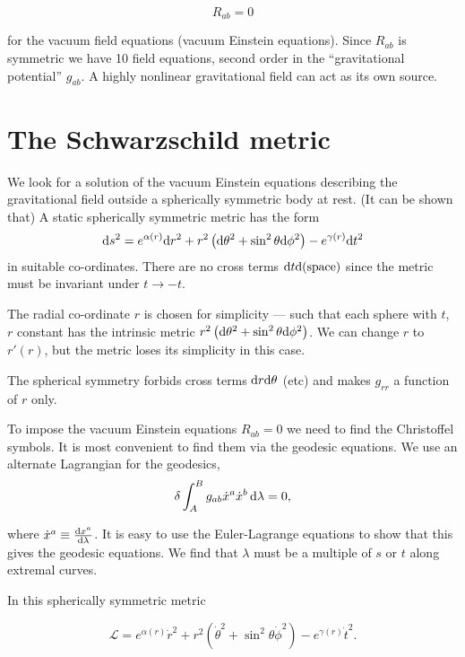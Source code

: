 \documentclass{notes}
\newcommand{\cL}{\mathcal{L}}
\begin{document}
\begin{equation}\label{eq:einstein}
R_{a b} = 0
\end{equation}

for the vacuum field equations (vacuum Einstein equations).  Since
$R_{a b}$ is symmetric we have 10 field equations, second order
in the ``gravitational potential'' $g_{a b}$.  A highly nonlinear
gravitational field can act as its own source.

\section{The Schwarzschild metric}

We look for a solution of the vacuum Einstein equations describing the
gravitational field outside a spherically symmetric body at rest.
(It can be shown that) A static spherically symmetric metric has the
form
\[
\mathrm{d} s^2 = e^{\alpha(r)} \mathrm{d} r^2 + r^2 \left( \mathrm{d} \theta^2
+ \sin^2 \theta \mathrm{d} \phi^2 \right) - e^{\gamma(r)}\mathrm{d} t^2
\]
in suitable co-ordinates.  There are no cross terms $\mathrm{d} t \mathrm{d} (
\text{space})$ since the metric must be invariant under $t \to -t$.

The radial co-ordinate $r$ is chosen for simplicity --- such that each
sphere with $t$, $r$ constant has the intrinsic metric
$r^2 \left( \mathrm{d} \theta^2 + \sin^2 \theta \mathrm{d} \phi^2 \right)$.  We
can change $r$ to $r'(r)$, but the metric loses its simplicity in this
case.

The spherical symmetry forbids cross terms $\mathrm{d} r \mathrm{d} \theta$ (etc)
and makes $g_{rr}$ a function of $r$ only.

To impose the vacuum Einstein equations $R_{a b} = 0$ we need to
find the Christoffel symbols.  It is most convenient to find them
via the geodesic equations.  We use an alternate Lagrangian for
the geodesics,
\[
\delta \int_A^B g_{a b} \Dot{x}^a \Dot{x}^b\, \mathrm{d} \lambda = 0,
\]

where $\Dot{x}^a \equiv \frac{\mathrm{d} x^a}{\mathrm{d}\lambda}$.  It is easy to
use the Euler-Lagrange equations to show that this gives the geodesic
equations.  We find that $\lambda$ must be a multiple of $s$ or $t$
along extremal curves.

In this spherically symmetric metric

\begin{equation}\label{eq:schwarzL}
\cL = e^{\alpha(r)} \Dot{r}^2 + r^2 \left( \Dot{\theta}^2 + \sin^2 \theta
\Dot{\phi}^2 \right) - e^{\gamma(r)} \Dot{t}^2.
\end{equation}
\end{document}
